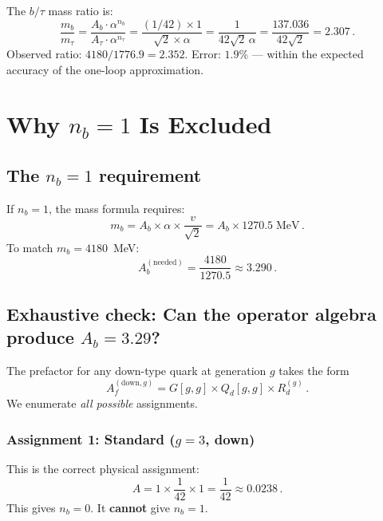 \documentclass[11pt,a4paper]{article}
\theoremstyle{definition}
\theoremstyle{remark}
\begin{document}
The $b/\tau$ mass ratio is:
\begin{equation}
\frac{m_b}{m_\tau} = \frac{A_b \cdot \alpha^{n_b}}{A_\tau \cdot \alpha^{n_\tau}}
= \frac{(1/42) \times 1}{\sqrt{2} \times \alpha}
= \frac{1}{42\sqrt{2}\,\alpha} = \frac{137.036}{42\sqrt{2}} = 2.307\,.
\end{equation}
Observed ratio: $4180/1776.9 = 2.352$.  Error: $1.9\%$ --- within the
expected accuracy of the one-loop approximation.

\section{Why $n_b = 1$ Is Excluded}
\label{sec:no-alt}

\subsection{The $n_b = 1$ requirement}

If $n_b = 1$, the mass formula requires:
\begin{equation}
m_b = A_b \times \alpha \times \frac{v}{\sqrt{2}}
    = A_b \times 1270.5 \;\text{MeV}\,.
\end{equation}
To match $m_b = 4180$~MeV:
\begin{equation}
A_b^{(\text{needed})} = \frac{4180}{1270.5} \approx 3.290\,.
\end{equation}

\subsection{Exhaustive check: Can the operator algebra produce $A_b = 3.29$?}

The prefactor for any down-type quark at generation $g$ takes the form
\begin{equation}
A_f^{(\text{down},g)} = G[g,g] \times Q_d[g,g] \times R_d^{(g)}\,.
\end{equation}
We enumerate \emph{all possible} assignments.

\subsubsection{Assignment 1: Standard ($g = 3$, down)}

This is the correct physical assignment:
\begin{equation}
A = 1 \times \frac{1}{42} \times 1 = \frac{1}{42} \approx 0.0238\,.
\end{equation}
This gives $n_b = 0$.  It \textbf{cannot} give $n_b = 1$.
\end{document}
